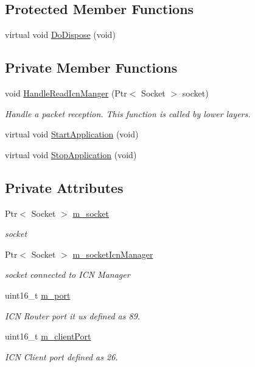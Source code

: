 \subsection*{Protected Member Functions}
\begin{DoxyCompactItemize}
\item 
virtual void \hyperlink{classns3_1_1IcnRouter_a753e828732d2efd5edf54965642a1605}{Do\-Dispose} (void)
\end{DoxyCompactItemize}
\subsection*{Private Member Functions}
\begin{DoxyCompactItemize}
\item 
void \hyperlink{classns3_1_1IcnRouter_ab7af309cff6c4061bb4ec42cacf2d149}{Handle\-Read\-Icn\-Manger} (Ptr$<$ Socket $>$ socket)
\begin{DoxyCompactList}\small\item\em Handle a packet reception. This function is called by lower layers. \end{DoxyCompactList}\item 
virtual void \hyperlink{classns3_1_1IcnRouter_a05d410c4dfb02bb8d7aaf6218ffb7254}{Start\-Application} (void)
\item 
virtual void \hyperlink{classns3_1_1IcnRouter_a92c56afe4750a18afca7ccca6410af46}{Stop\-Application} (void)
\end{DoxyCompactItemize}
\subsection*{Private Attributes}
\begin{DoxyCompactItemize}
\item 
Ptr$<$ Socket $>$ \hyperlink{classns3_1_1IcnRouter_a2b69d463e55b4be9f372c51bdb673d50}{m\-\_\-socket}
\begin{DoxyCompactList}\small\item\em socket \end{DoxyCompactList}\item 
Ptr$<$ Socket $>$ \hyperlink{classns3_1_1IcnRouter_ada56beecc0b64ce0ad38552c445dae88}{m\-\_\-socket\-Icn\-Manager}
\begin{DoxyCompactList}\small\item\em socket connected to I\-C\-N Manager \end{DoxyCompactList}\item 
uint16\-\_\-t \hyperlink{classns3_1_1IcnRouter_a793e6ef791d5581f4741e47cc969547e}{m\-\_\-port}
\begin{DoxyCompactList}\small\item\em I\-C\-N Router port it us defined as 89. \end{DoxyCompactList}\item 
uint16\-\_\-t \hyperlink{classns3_1_1IcnRouter_ab8a2228dfb2dda1af02f8017107d9f9a}{m\-\_\-client\-Port}
\begin{DoxyCompactList}\small\item\em I\-C\-N Client port defined as 26. \end{DoxyCompactList}\end{DoxyCompactItemize}


